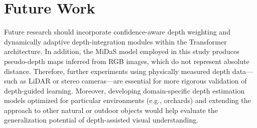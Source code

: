 \section{Future Work}

Future research should incorporate confidence-aware depth weighting and dynamically adaptive depth-integration modules within the Transformer architecture. In addition, the MiDaS \cite{ref3} model employed in this study produces pseudo-depth maps inferred from RGB images, which do not represent absolute distance. Therefore, further experiments using physically measured depth data—such as LiDAR or stereo cameras—are essential for more rigorous validation of depth-guided learning. Moreover, developing domain-specific depth estimation models optimized for particular environments (e.g., orchards) and extending the approach to other natural or outdoor objects would help evaluate the generalization potential of depth-assisted visual understanding.


